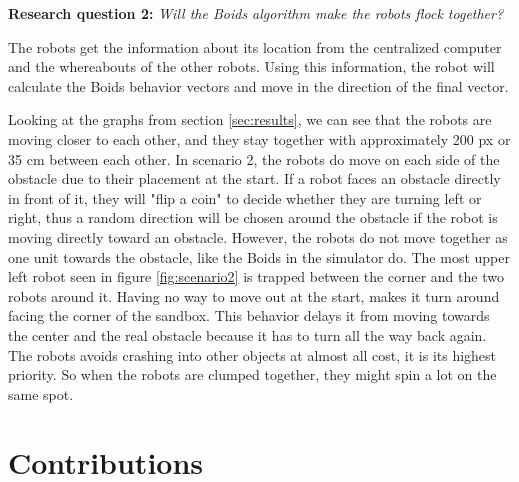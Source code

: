 \textbf{Research question 2:} {\it Will the Boids algorithm make the robots flock together?}

The robots get the information about its location from the centralized computer and the whereabouts of the other robots. Using this information, the robot will calculate the Boids behavior vectors and move in the direction of the final vector.

Looking at the graphs from section \ref{sec:results}, we can see that the robots are moving closer to each other, and they stay together with approximately 200 px or 35 cm between each other. In scenario 2, the robots do move on each side of the obstacle due to their placement at the start. If a robot faces an obstacle directly in front of it, they will "flip a coin" to decide whether they are turning left or right, thus a random direction will be chosen around the obstacle if the robot is moving directly toward an obstacle.
However, the robots do not move together as one unit towards the obstacle, like the Boids in the simulator do. The most upper left robot seen in figure \ref{fig:scenario2} is trapped between the corner and the two robots around it. Having no way to move out at the start, makes it turn around facing the corner of the sandbox. This behavior delays it from moving towards the center and the real obstacle because it has to turn all the way back again.
The robots avoids crashing into other objects at almost all cost, it is its highest priority. So when the robots are clumped together, they might spin a lot on the same spot.



\section{Contributions}
\label{sec:Contributions}

